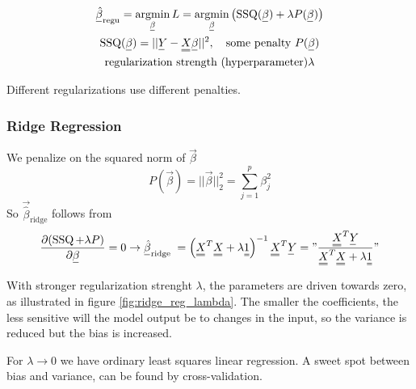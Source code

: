 
\begin{equation}
    \begin{gathered}
        \vec{\hat{\beta}}_\text{regu} = \argmin_{\vec{\beta}} L = \argmin_{\vec{\beta}} \left( \operatorname{SSQ}(\vec{\beta}) + \lambda P(\vec{\beta}) \right) \\
        \operatorname{SSQ}(\vec{\beta}) = || \vec{Y} - \mat{X} \vec{\beta} ||^2, \quad \text{some penalty } P(\vec{\beta}) \\
        \text{regularization strength (hyperparameter)} \lambda
    \end{gathered}
\end{equation}

Different regularizations use different penalties.

\subsubsection{Ridge Regression}
We penalize on the squared norm of $\vec{\beta}$
\begin{equation}
    P(\vec{\beta}) = || \vec{\beta} ||_2^2 = \sum_{j=1}^p \beta_j^2
\end{equation}
So $\vec{\hat{\beta}}_\text{ridge}$ follows from
\begin{equation}
    \frac{\partial(\operatorname{SSQ}+\lambda P)}{\partial \vec{\beta}}=0 \rightarrow \vec{\hat{\beta}}_{\text {ridge }}=\left(\mat{X}^T \mat{X}+\lambda \mat{1}\right)^{-1} \mat{X}^T \vec{Y}=" \frac{\mat{X}^T \vec{Y}}{\mat{X}^T \mat{X}+\lambda \mat{1}} "
\end{equation}

With stronger regularization strenght $\lambda$, the parameters are driven towards zero, as 
illustrated in figure \ref{fig:ridge_reg_lambda}. The smaller the coefficients, the less sensitive
will the model output be to changes in the input, so the variance is reduced but the bias is increased.

For $\lambda \rightarrow 0$ we have
ordinary least squares linear regression. A sweet spot between bias and variance,
can be found by cross-validation.

